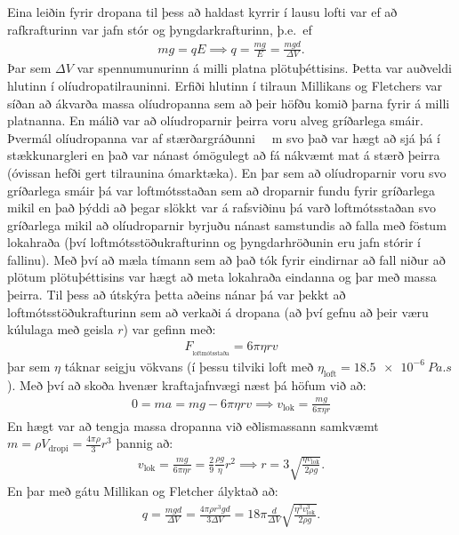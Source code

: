 Eina leiðin fyrir dropana til þess að haldast kyrrir í lausu lofti var ef að rafkrafturinn var jafn stór og þyngdarkrafturinn, þ.e.~ef
\begin{align*}
    mg = qE \implies q = \frac{mg}{E} = \frac{mgd}{\Delta V}.
\end{align*}
Þar sem $\Delta V$ var spennumunurinn á milli platna plötuþéttisins. Þetta var auðveldi hlutinn í olíudropatilrauninni. Erfiði hlutinn í tilraun Millikans og Fletchers var síðan að ákvarða massa olíudropanna sem að þeir höfðu komið þarna fyrir á milli platnanna. En málið var að olíudroparnir þeirra voru alveg gríðarlega smáir. Þvermál olíudropanna var af stærðargráðunni \SI{}{\mu m} svo það var hægt að sjá þá í stækkunargleri en það var nánast ómögulegt að fá nákvæmt mat á stærð þeirra (óvissan hefði gert tilraunina ómarktæka). En þar sem að olíudroparnir voru svo gríðarlega smáir þá var loftmótsstaðan sem að droparnir fundu fyrir gríðarlega mikil en það þýddi að þegar slökkt var á rafsviðinu þá varð loftmótsstaðan svo gríðarlega mikil að olíudroparnir byrjuðu nánast samstundis að falla með föstum lokahraða (því loftmótsstöðukrafturinn og þyngdarhröðunin eru jafn stórir í fallinu). Með því að mæla tímann sem að það tók fyrir eindirnar að fall niður að plötum plötuþéttisins var hægt að meta lokahraða eindanna og þar með massa þeirra. Til þess að útskýra þetta aðeins nánar þá var þekkt að loftmótsstöðukrafturinn sem að verkaði á dropana (að því gefnu að þeir væru kúlulaga með geisla $r$) var gefinn með:
\begin{align*}
    F_{\!_\text{loftmótsstaða}} = 6\pi \eta rv
\end{align*}
þar sem $\eta$ táknar seigju vökvans (í þessu tilviki loft með $\eta_{\text{loft}} = \SI{18.5e-6}{Pa.s}$). Með því að skoða hvenær kraftajafnvægi næst þá höfum við að:
\begin{align*}
    0 = ma = mg - 6\pi \eta rv \implies v_{\text{lok}} = \frac{mg}{6\pi \eta r} 
\end{align*}
En hægt var að tengja massa dropanna við eðlismassann samkvæmt $m = \rho V_{\text{dropi}} = \frac{4 \pi \rho}{3}r^3$ þannig að:
\begin{align*}
    v_{\text{lok}} = \frac{mg}{6\pi \eta r} = \frac{2}{9} \frac{\rho g}{\eta} r^2 \implies r = 3\sqrt{\frac{\eta v_{\text{lok}}}{2 \rho g}}.
\end{align*}
En þar með gátu Millikan og Fletcher ályktað að:
\begin{align*}
    q = \frac{mgd}{\Delta V} = \frac{4 \pi \rho r^3 g d}{3 \Delta V} = 18 \pi \frac{d}{\Delta V} \sqrt{\frac{\eta^3 v^3_{\text{lok}}}{2 \rho g}}.
\end{align*}

